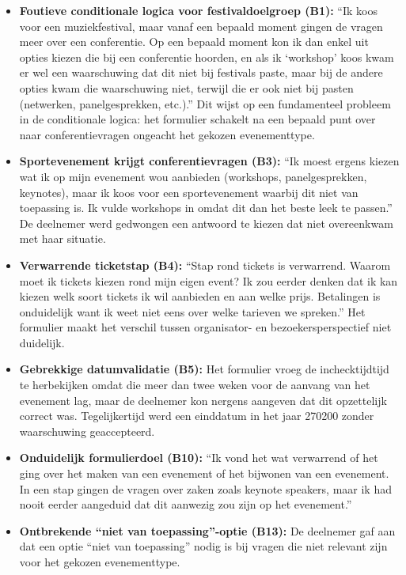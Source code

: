 \begin{itemize}
  \item \textbf{Foutieve conditionale logica voor festivaldoelgroep (B1):} ``Ik koos voor een muziekfestival, maar vanaf een bepaald moment gingen de vragen meer over een conferentie. Op een bepaald moment kon ik dan enkel uit opties kiezen die bij een conferentie hoorden, en als ik `workshop' koos kwam er wel een waarschuwing dat dit niet bij festivals paste, maar bij de andere opties kwam die waarschuwing niet, terwijl die er ook niet bij pasten (netwerken, panelgesprekken, etc.).'' Dit wijst op een fundamenteel probleem in de conditionale logica: het formulier schakelt na een bepaald punt over naar conferentievragen ongeacht het gekozen evenementtype.
  \item \textbf{Sportevenement krijgt conferentievragen (B3):} ``Ik moest ergens kiezen wat ik op mijn evenement wou aanbieden (workshops, panelgesprekken, keynotes), maar ik koos voor een sportevenement waarbij dit niet van toepassing is. Ik vulde workshops in omdat dit dan het beste leek te passen.'' De deelnemer werd gedwongen een antwoord te kiezen dat niet overeenkwam met haar situatie.
  \item \textbf{Verwarrende ticketstap (B4):} ``Stap rond tickets is verwarrend. Waarom moet ik tickets kiezen rond mijn eigen event? Ik zou eerder denken dat ik kan kiezen welk soort tickets ik wil aanbieden en aan welke prijs. Betalingen is onduidelijk want ik weet niet eens over welke tarieven we spreken.'' Het formulier maakt het verschil tussen organisator- en bezoekersperspectief niet duidelijk.
  \item \textbf{Gebrekkige datumvalidatie (B5):} Het formulier vroeg de inchecktijdtijd te herbekijken omdat die meer dan twee weken voor de aanvang van het evenement lag, maar de deelnemer kon nergens aangeven dat dit opzettelijk correct was. Tegelijkertijd werd een einddatum in het jaar 270200 zonder waarschuwing geaccepteerd.
  \item \textbf{Onduidelijk formulierdoel (B10):} ``Ik vond het wat verwarrend of het ging over het maken van een evenement of het bijwonen van een evenement. In een stap gingen de vragen over zaken zoals keynote speakers, maar ik had nooit eerder aangeduid dat dit aanwezig zou zijn op het evenement.''
  \item \textbf{Ontbrekende ``niet van toepassing''-optie (B13):} De deelnemer gaf aan dat een optie ``niet van toepassing'' nodig is bij vragen die niet relevant zijn voor het gekozen evenementtype.
\end{itemize}

